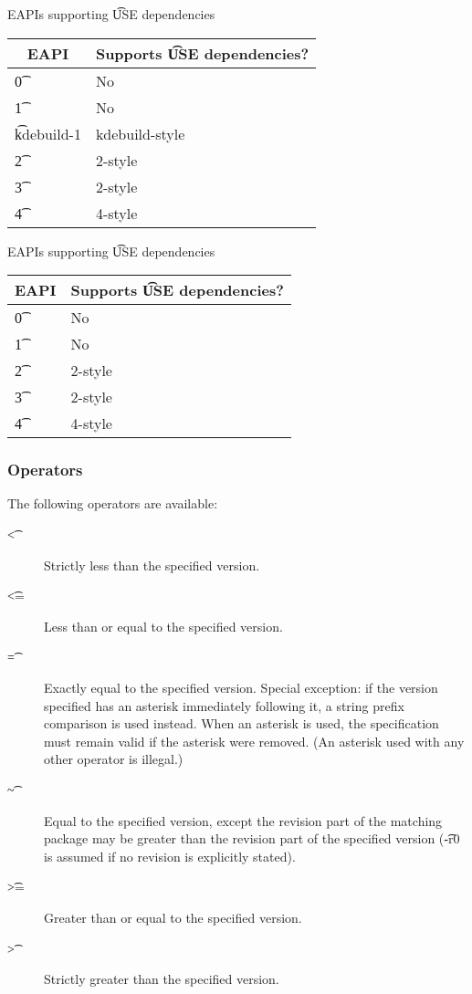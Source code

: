 \IFKDEBUILDELSE
{
    \begin{centertable}{EAPIs supporting \t{USE} dependencies} \label{tab:use-deps-table}
    \begin{tabular}{ l l }
        \toprule
        \multicolumn{1}{c}{\textbf{EAPI}} &
        \multicolumn{1}{c}{\textbf{Supports \t{USE} dependencies?}} \\
        \midrule
    \t{0} & No \\
    \t{1} & No \\
    \t{kdebuild-1} & kdebuild-style \\
    \t{2} & 2-style \\
    \t{3} & 2-style \\
    \t{4} & 4-style \\
    \bottomrule
    \end{tabular}
    \end{centertable}
}{
    \begin{centertable}{EAPIs supporting \t{USE} dependencies} \label{tab:use-deps-table}
    \begin{tabular}{ l l }
        \toprule
        \multicolumn{1}{c}{\textbf{EAPI}} &
        \multicolumn{1}{c}{\textbf{Supports \t{USE} dependencies?}} \\
        \midrule
    \t{0} & No \\
    \t{1} & No \\
    \t{2} & 2-style \\
    \t{3} & 2-style \\
    \t{4} & 4-style \\
    \bottomrule
    \end{tabular}
    \end{centertable}
}

\subsubsection{Operators}
\label{sec:dep-operator}

The following operators are available:

\begin{description}
\item[\t{<}] Strictly less than the specified version.
\item[\t{<=}] Less than or equal to the specified version.
\item[\t{=}] Exactly equal to the specified version. Special exception: if the version
    specified has an asterisk immediately following it, a string prefix comparison is
    used instead. When an asterisk is used, the specification must remain valid if the
    asterisk were removed. (An asterisk used with any other operator is illegal.)
\item[\t{\textasciitilde}] Equal to the specified version, except the revision part of the matching
    package may be greater than the revision part of the specified version (\t{-r0} is
    assumed if no revision is explicitly stated).
\item[\t{>=}] Greater than or equal to the specified version.
\item[\t{>}] Strictly greater than the specified version.
\end{description}

